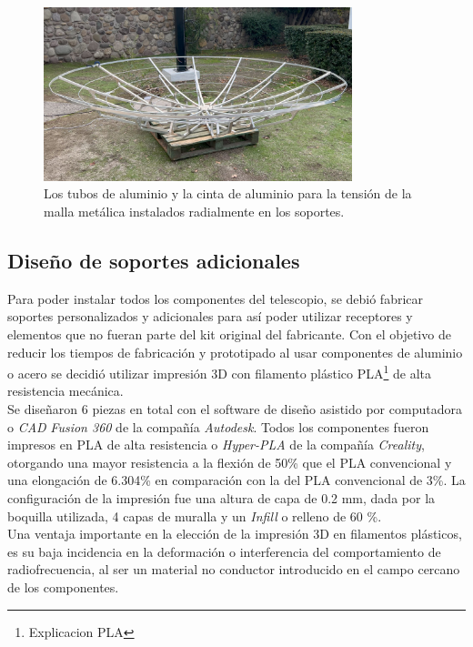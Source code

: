 \begin{figure}
    \centering
    \includegraphics[width=0.8\textwidth]{img/estructura2}
    \caption{Los tubos de aluminio y la cinta de aluminio para la tensión de la malla metálica instalados radialmente en los soportes.}
    \label{fig:ensamble3}
\end{figure}

\subsection{Diseño de soportes adicionales}

Para poder instalar todos los componentes del telescopio, se debió fabricar soportes personalizados y adicionales para así poder utilizar receptores y elementos que no fueran parte del kit original del fabricante. Con el objetivo de reducir los tiempos de fabricación y prototipado al usar componentes de aluminio o acero se decidió utilizar impresión 3D con filamento plástico PLA\footnote{Explicacion PLA} de alta resistencia mecánica.\\

Se diseñaron 6 piezas en total con el software de diseño asistido por computadora o \textit{CAD} \textit{Fusion 360} de la compañía \textit{Autodesk}. Todos los componentes fueron impresos en PLA de alta resistencia o \textit{Hyper-PLA} de la compañía \textit{Creality}, otorgando una mayor resistencia a la flexión de 50\% que el PLA convencional y una elongación de 6.304\% en comparación con la del PLA convencional de 3\%. La configuración de la impresión fue una altura de capa de 0.2 mm, dada por la boquilla utilizada, 4 capas de muralla y un \textit{Infill} o relleno de 60 \%.\\

Una ventaja importante en la elección de la impresión 3D en filamentos plásticos, es su baja incidencia en la deformación o interferencia del comportamiento de radiofrecuencia, al ser un material no conductor introducido en el campo cercano de los componentes.\\


